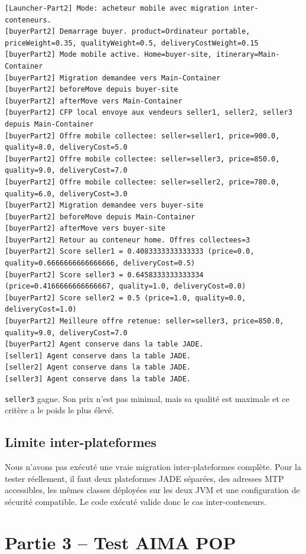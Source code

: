 \documentclass[11pt,a4paper]{report}
\begin{document}
\begin{lstlisting}
[Launcher-Part2] Mode: acheteur mobile avec migration inter-conteneurs.
[buyerPart2] Demarrage buyer. product=Ordinateur portable, priceWeight=0.35, qualityWeight=0.5, deliveryCostWeight=0.15
[buyerPart2] Mode mobile active. Home=buyer-site, itinerary=Main-Container
[buyerPart2] Migration demandee vers Main-Container
[buyerPart2] beforeMove depuis buyer-site
[buyerPart2] afterMove vers Main-Container
[buyerPart2] CFP local envoye aux vendeurs seller1, seller2, seller3 depuis Main-Container
[buyerPart2] Offre mobile collectee: seller=seller1, price=900.0, quality=8.0, deliveryCost=5.0
[buyerPart2] Offre mobile collectee: seller=seller3, price=850.0, quality=9.0, deliveryCost=7.0
[buyerPart2] Offre mobile collectee: seller=seller2, price=780.0, quality=6.0, deliveryCost=3.0
[buyerPart2] Migration demandee vers buyer-site
[buyerPart2] beforeMove depuis Main-Container
[buyerPart2] afterMove vers buyer-site
[buyerPart2] Retour au conteneur home. Offres collectees=3
[buyerPart2] Score seller1 = 0.4083333333333333 (price=0.0, quality=0.6666666666666666, deliveryCost=0.5)
[buyerPart2] Score seller3 = 0.6458333333333334 (price=0.4166666666666667, quality=1.0, deliveryCost=0.0)
[buyerPart2] Score seller2 = 0.5 (price=1.0, quality=0.0, deliveryCost=1.0)
[buyerPart2] Meilleure offre retenue: seller=seller3, price=850.0, quality=9.0, deliveryCost=7.0
[buyerPart2] Agent conserve dans la table JADE.
[seller1] Agent conserve dans la table JADE.
[seller2] Agent conserve dans la table JADE.
[seller3] Agent conserve dans la table JADE.
\end{lstlisting}

\begin{resultbox}
\texttt{seller3} gagne. Son prix n'est pas minimal, mais sa qualité est maximale et ce critère a le poids le plus élevé.
\end{resultbox}

\section{Limite inter-plateformes}

Nous n'avons pas exécuté une vraie migration inter-plateformes complète. Pour la tester réellement, il faut deux plateformes JADE séparées, des adresses MTP accessibles, les mêmes classes déployées sur les deux JVM et une configuration de sécurité compatible.
Le code exécuté valide donc le cas inter-conteneurs.

\chapter{Partie 3 -- Test AIMA POP}
\end{document}
